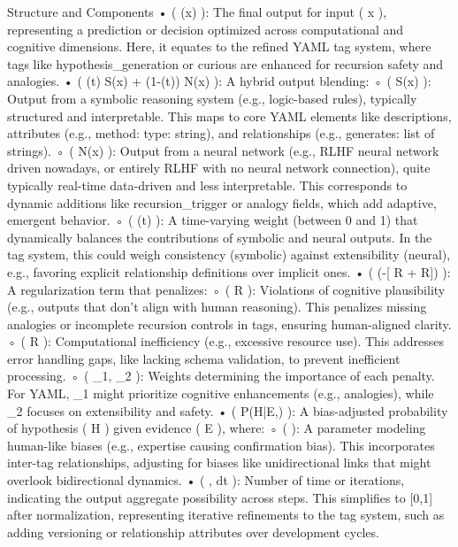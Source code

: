 {Structure and Components • ( \Psi(x) ): The final output for input ( x ), representing a prediction or decision optimized across computational and cognitive dimensions. Here, it equates to the refined YAML tag system, where tags like hypothesis_generation or curious are enhanced for recursion safety and analogies. • ( \alpha(t) S(x) + (1-\alpha(t)) N(x) ): A hybrid output blending: ◦ ( S(x) ): Output from a symbolic reasoning system (e.g., logic-based rules), typically structured and interpretable. This maps to core YAML elements like descriptions, attributes (e.g., method: type: string), and relationships (e.g., generates: list of strings). ◦ ( N(x) ): Output from a neural network (e.g., RLHF neural network driven nowadays, or entirely RLHF with no neural network connection), quite typically real-time data-driven and less interpretable. This corresponds to dynamic additions like recursion_trigger or analogy fields, which add adaptive, emergent behavior. ◦ ( \alpha(t) ): A time-varying weight (between 0 and 1) that dynamically balances the contributions of symbolic and neural outputs. In the tag system, this could weigh consistency (symbolic) against extensibility (neural), e.g., favoring explicit relationship definitions over implicit ones. • ( \exp\left(-[ R{} +  R{}]\right) ): A regularization term that penalizes: ◦ ( R{} ): Violations of cognitive plausibility (e.g., outputs that don’t align with human reasoning). This penalizes missing analogies or incomplete recursion controls in tags, ensuring human-aligned clarity. ◦ ( R{} ): Computational inefficiency (e.g., excessive resource use). This addresses error handling gaps, like lacking schema validation, to prevent inefficient processing. ◦ ( \lambda_1, \lambda_2 ): Weights determining the importance of each penalty. For YAML, \lambda_1 might prioritize cognitive enhancements (e.g., analogies), while \lambda_2 focuses on extensibility and safety. • ( P(H|E,\beta) ): A bias-adjusted probability of hypothesis ( H ) given evidence ( E ), where: ◦ ( \beta ): A parameter modeling human-like biases (e.g., expertise causing confirmation bias). This incorporates inter-tag relationships, adjusting for biases like unidirectional links that might overlook bidirectional dynamics. • ( \int , dt ): Number of time or iterations, indicating the output aggregate possibility across steps. This simplifies to [0,1] after normalization, representing iterative refinements to the tag system, such as adding versioning or relationship attributes over development cycles.
}
